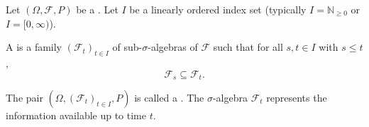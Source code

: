 \begin{definition} \label{definition:filtration_of_sigma_algebras_on_a_probability_space}
Let $(\Omega, \mathcal{F}, P)$ be a . Let $I$ be a linearly ordered index set (typically $I = \mathbb{N}_{\geq 0}$ or $I = [0, \infty)$).

A  is a family $(\mathcal{F}_t)_{t \in I}$ of sub-$\sigma$-algebras of $\mathcal{F}$ such that for all $s, t \in I$ with $s \leq t$,
$$\mathcal{F}_s \subseteq \mathcal{F}_t.$$

The pair $(\Omega, (\mathcal{F}_t)_{t \in I}, P)$ is called a . The $\sigma$-algebra $\mathcal{F}_t$ represents the information available up to time $t$.
\end{definition}
